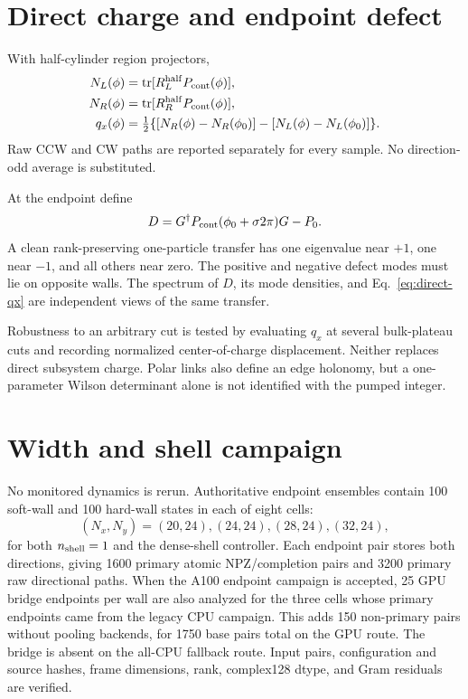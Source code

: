 \documentclass[aps,prb,twocolumn,floatfix,nofootinbib]{revtex4-2}
\newcommand{\tr}{\operatorname{tr}}
\begin{document}
\section{Direct charge and endpoint defect}

With half-cylinder region projectors,
\begin{align}
 N_L(\phi)&=\tr[R_L^{\rm half}P_{\rm cont}(\phi)],\\
 N_R(\phi)&=\tr[R_R^{\rm half}P_{\rm cont}(\phi)],\\
 q_x(\phi)&=\tfrac12\{[N_R(\phi)-N_R(\phi_0)]
 -[N_L(\phi)-N_L(\phi_0)]\}.
 \label{eq:direct-qx}
\end{align}
Raw CCW and CW paths are reported separately for every sample.  No
direction-odd average is substituted.

At the endpoint define
\begin{equation}
 D=G^\dagger P_{\rm cont}(\phi_0+\sigma2\pi)G-P_0 .
 \label{eq:defect}
\end{equation}
A clean rank-preserving one-particle transfer has one eigenvalue near $+1$,
one near $-1$, and all others near zero.  The positive and negative defect
modes must lie on opposite walls.  The spectrum of $D$, its mode densities,
and Eq.~\eqref{eq:direct-qx} are independent views of the same transfer.

Robustness to an arbitrary cut is tested by evaluating $q_x$ at several
bulk-plateau cuts and recording normalized center-of-charge displacement.
Neither replaces direct subsystem charge.  Polar links also define an edge
holonomy, but a one-parameter Wilson determinant alone is not identified
with the pumped integer.

\section{Width and shell campaign}

No monitored dynamics is rerun.  Authoritative endpoint ensembles contain
100 soft-wall and 100 hard-wall states in each of eight cells:
\begin{equation}
 (N_x,N_y)=(20,24),(24,24),(28,24),(32,24),
\end{equation}
for both $n_{\rm shell}=1$ and the dense-shell controller.  Each endpoint
pair stores both directions, giving 1600 primary atomic NPZ/completion pairs
and 3200 primary raw directional paths.  When the A100 endpoint campaign is
accepted, 25 GPU bridge endpoints per wall are also analyzed for the three
cells whose primary endpoints came from the legacy CPU campaign.  This adds
150 non-primary pairs without pooling backends, for 1750 base pairs total on
the GPU route.  The bridge is absent on the all-CPU fallback route.  Input
pairs, configuration and source hashes,
frame dimensions, rank, complex128 dtype, and Gram residuals are verified.
\end{document}
